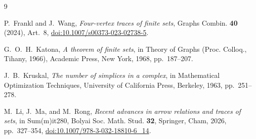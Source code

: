 \documentclass[11pt]{amsart}
\begin{document}
\begin{thebibliography}{9}

P.~Frankl and J.~Wang,
\emph{Four-vertex traces of finite sets},
Graphs Combin. \textbf{40} (2024), Art.~8,
\href{https://doi.org/10.1007/s00373-023-02738-5}
{doi:10.1007/s00373-023-02738-5}.

G.~O.~H.~Katona,
\emph{A theorem of finite sets},
in Theory of Graphs (Proc. Colloq., Tihany, 1966),
Academic Press, New York, 1968, pp.~187--207.

J.~B.~Kruskal,
\emph{The number of simplices in a complex},
in Mathematical Optimization Techniques,
University of California Press, Berkeley, 1963, pp.~251--278.

M.~Li, J.~Ma, and M.~Rong,
\emph{Recent advances in arrow relations and traces of sets},
in Sum(m)it280, Bolyai Soc. Math. Stud. \textbf{32},
Springer, Cham, 2026, pp.~327--354,
\href{https://doi.org/10.1007/978-3-032-18810-6_14}
{doi:10.1007/978-3-032-18810-6\_14}.

\end{thebibliography}
\end{document}
